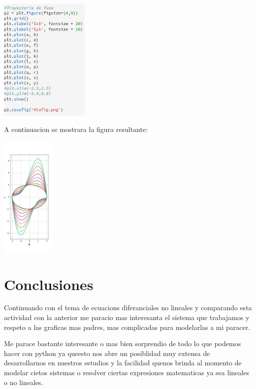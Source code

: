 \documentclass{article}
\begin{document}
\begin{itemize}
\begin{center}
\includegraphics[height=6cm]{cod6.png}
\end{center}


A continuacion se mostrara la figura resultante:


\begin{center}
\includegraphics[height=6cm]{4tafig.png}
\end{center}

\end{itemize}


\section{Conclusiones}

Continuando con el tema de ecuacions diferanciales no lineales y comparando esta actividad con la anterior me paracio mas interesanta el sistema que trabajamos y respeto a las graficas mas padres, mas complicadas para modelarlas a mi paracer. 

Me parace bastante interesante o mas bien sorprendio de todo lo que podemos hacer con python ya queesto nos abre un posiblidad muy extensa de desarrollarnos en nuestros estudios y la facilidad quenos brinda al momento de modelar cietos sistemas o resolver ciertas expresiones matematicas ya sea lineales o no lineales.
\end{document}
